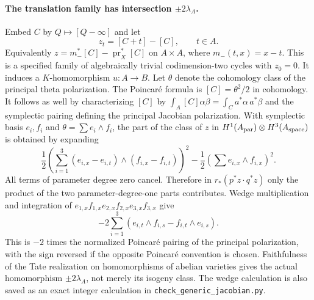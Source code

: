\paragraph{The translation family has intersection $\pm2\lambda_A$.}
Embed $C$ by $Q\mapsto[Q-\infty]$ and let
\[
 z_t=[C+t]-[C],\qquad t\in A.
\]
Equivalently $z=m_-^*[C]-\operatorname{pr}_X^*[C]$ on
$A\times A$, where $m_-(t,x)=x-t$.  This is a specified family
of algebraically trivial codimension-two cycles with $z_0=0$.
It induces a $K$-homomorphism $u:A\to B$.
Let $\theta$ denote the cohomology class of the principal theta
polarization.  The Poincaré formula is $[C]=\theta^2/2$ in
cohomology.  It follows as well by characterizing $[C]$ by
$\int_A[C]\alpha\beta=\int_Ca^*\alpha\,a^*\beta$ and the
symplectic pairing defining the principal Jacobian polarization.
With symplectic basis $e_i,f_i$ and
$\theta=\sum e_i\wedge f_i$, the part of the class of $z$ in
$H^1(A_{\rm par})\otimes H^3(A_{\rm space})$ is obtained by
expanding
\[
 \frac12\left(\sum_{i=1}^3
 (e_{i,x}-e_{i,t})\wedge(f_{i,x}-f_{i,t})\right)^2
       -\frac12\left(\sum e_{i,x}\wedge f_{i,x}\right)^2.
\]
All terms of parameter degree zero cancel.  Therefore in
$r_*(p^*z\cdot q^*z)$ only the product of the two parameter-degree-one
parts contributes.  Wedge multiplication and integration of
$e_{1,x}f_{1,x}e_{2,x}f_{2,x}e_{3,x}f_{3,x}$ give
\[
 -2\sum_{i=1}^3
 (e_{i,t}\wedge f_{i,s}-f_{i,t}\wedge e_{i,s}).
\]
This is $-2$ times the normalized Poincaré pairing of the
principal polarization, with the sign reversed if the opposite
Poincaré convention is chosen.  Faithfulness of the Tate
realization on homomorphisms of abelian varieties
\cite[Theorem 12.5, pp.~21--22]{DGJ_MilneAV} gives the
actual homomorphism $\pm2\lambda_A$, not merely its isogeny class.
The wedge calculation is also saved as an exact integer
calculation in \texttt{check\_generic\_jacobian.py}.

